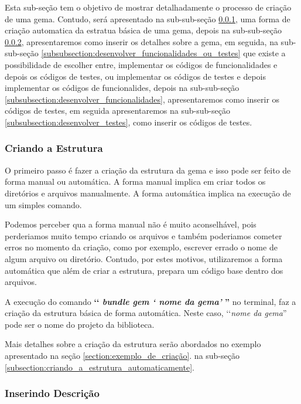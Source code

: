 Esta sub-seção tem o objetivo de mostrar detalhadamente o processo de criação de uma gema. Contudo, será
apresentado na sub-sub-seção \ref{subsubsection:criando_a_estrutura}, uma forma de criação automatica da
estratua básica de uma gema, depois na sub-sub-seção \ref{subsubsection:inserindo_descrição},
apresentaremos como inserir os detalhes sobre a gema, em seguida, na sub-sub-seção
\ref{subsubsection:desenvolver_funcionalidades_ou_testes} que existe a possibilidade de escolher
entre, implementar os códigos de funcionalidades e depois os códigos de testes, ou implementar os
códigos de testes e depois implementar os códigos de funcionalides, depois na sub-sub-seção
\ref{subsubsection:desenvolver_funcionalidades}, apresentaremos como inserir os códigos de testes, em
seguida apresentaremos na sub-sub-seção \ref{subsubsection:desenvolver_testes}, como inserir os
códigos de testes.


\subsubsection{Criando a Estrutura}
\label{subsubsection:criando_a_estrutura}


O primeiro passo é fazer a criação da estrutura da gema e isso pode ser feito de forma manual ou automática.
A forma manual implica em criar todos os diretórios e arquivos manualmente. A forma automática implica na
execução de um simples comando.

Podemos perceber qua a forma manual não é muito aconselhável, pois perderiamos muito tempo criando
os arquivos e também poderiamos cometer erros no momento da criação, como por exemplo, escrever errado
o nome de algum arquivo ou diretório. Contudo, por estes motivos, utilizaremos a forma automática
que além de criar a estrutura, prepara um código base dentro dos arquivos.

A execução do comando \textbf{‘‘ \emph{bundle gem ‘ nome da gema'} ''} no terminal, faz a criação da
estrutura básica de forma automática. Neste caso, ‘‘\emph{nome da gema}'' pode ser o nome do projeto
da biblioteca.

Mais detalhes sobre a criação da estrutura serão abordados no exemplo apresentado na seção
\ref{section:exemplo_de_criação}. na sub-seção \ref{subsection:criando_a_estrutura_automaticamente}.


\subsubsection{Inserindo Descrição}
\label{subsubsection:inserindo_descrição}



